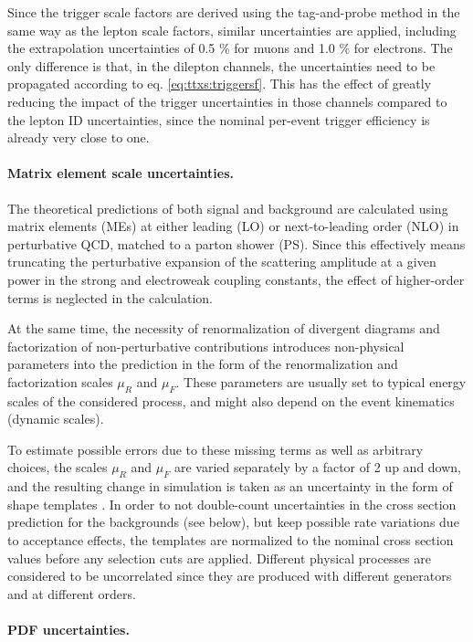 Since the trigger scale factors are derived using the tag-and-probe method in the same way as the lepton scale factors, similar uncertainties are applied, including the extrapolation uncertainties of 0.5 \% for muons and 1.0 \% for electrons. The only difference is that, in the dilepton channels, the uncertainties need to be propagated according to eq. \ref{eq:ttxs:triggersf}. This has the effect of greatly reducing the impact of the trigger uncertainties in those channels compared to the lepton ID uncertainties, since the nominal per-event trigger efficiency is already very close to one.

\paragraph{Matrix element scale uncertainties.}

The theoretical predictions of both signal and background are calculated using matrix elements (MEs) at either leading (LO) or next-to-leading order (NLO) in perturbative QCD, matched to a parton shower (PS). Since this effectively means truncating the perturbative expansion of the scattering amplitude at a given power in the strong and electroweak coupling constants, the effect of higher-order terms is neglected in the calculation.

At the same time, the necessity of renormalization of divergent diagrams and factorization of non-perturbative contributions introduces non-physical parameters into the prediction in the form of the renormalization and factorization scales $\mu_R$ and $\mu_F$. These parameters are usually set to typical energy scales of the considered process, and might also depend on the event kinematics (dynamic scales).

To estimate possible errors due to these missing terms as well as arbitrary choices, the scales $\mu_R$ and $\mu_F$ are varied separately by a factor of 2 up and down, and the resulting change in simulation is taken as an uncertainty in the form of shape templates \cite{Cacciari:2004}. In order to not double-count uncertainties in the cross section prediction for the backgrounds (see below), but keep possible rate variations due to acceptance effects, the templates are normalized to the nominal cross section values before any selection cuts are applied. Different physical processes are considered to be uncorrelated since they are produced with different generators and at different orders. 

\paragraph{PDF uncertainties.}

